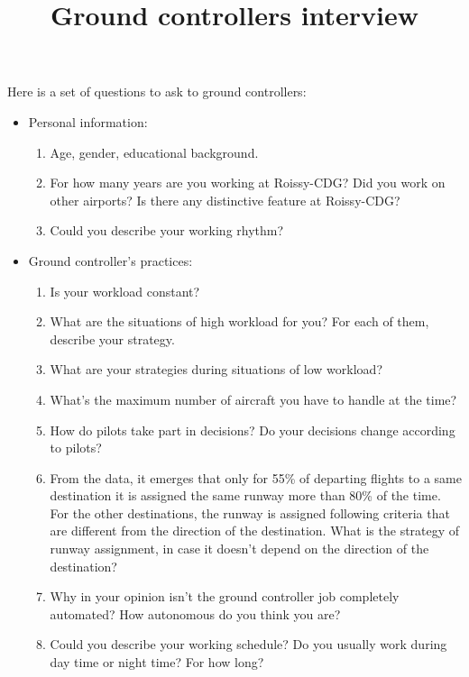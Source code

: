 \documentclass{article}
\begin{document}
		
	\title{Ground controllers interview}
	\maketitle
Here is a set of questions to ask to ground controllers:

\begin{itemize}
    \item Personal information:
        \begin{enumerate}
            \item Age, gender, educational background.
            \item For how many years are you working at Roissy-CDG? Did you work on other airports? Is there any distinctive feature at Roissy-CDG? 
            \item Could you describe your working rhythm?
		\end{enumerate}
    \item Ground controller's practices:
    		\begin{enumerate}
            \item Is your workload constant? 
            \item What are the situations of high workload for you? For each of them, describe your strategy.
            \item What are your strategies during situations of low workload?
            \item What's the maximum number of aircraft you have to handle at the time?
            \item How do pilots take part in decisions? Do your decisions change according to pilots?
            \item From the data, it emerges that only for 55\% of departing flights to a same destination it is assigned the same runway more than 80\% of the time. For the other destinations, the runway is assigned following criteria that are different from the direction of the destination. What is the strategy of runway assignment, in case it doesn't depend on the direction of the destination?
            \item Why in your opinion isn't the ground controller job completely automated? How autonomous do you think you are?
            \item Could you describe your working schedule? Do you usually work during day time or night time? For how long?
            

\end{enumerate}
\end{itemize}
\end{document}
